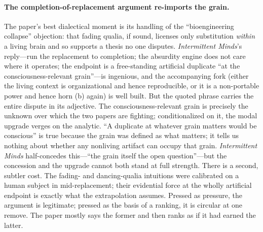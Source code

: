 \documentclass[11pt]{article}
\newcommand{\IM}{\emph{Intermittent Minds}}
\begin{document}
\paragraph{The completion-of-replacement argument re-imports the grain.} The paper's best dialectical moment is its handling of the ``bioengineering collapse'' objection: that fading qualia, if sound, licenses only substitution \emph{within} a living brain and so supports a thesis no one disputes. \IM{}'s reply---run the replacement to completion; the absurdity engine does not care where it operates; the endpoint is a free-standing artificial duplicate ``at the consciousness-relevant grain''---is ingenious, and the accompanying fork (either the living context is organizational and hence reproducible, or it is a non-portable power and hence horn (b) again) is well built. But the quoted phrase carries the entire dispute in its adjective. The consciousness-relevant grain is precisely the unknown over which the two papers are fighting; conditionalized on it, the modal upgrade verges on the analytic. ``A duplicate at whatever grain matters would be conscious'' is true because the grain was defined as what matters; it tells us nothing about whether any nonliving artifact can occupy that grain. \IM{} half-concedes this---``the grain itself the open question''---but the concession and the upgrade cannot both stand at full strength. There is a second, subtler cost. The fading- and dancing-qualia intuitions were calibrated on a human subject in mid-replacement; their evidential force at the wholly artificial endpoint is exactly what the extrapolation assumes. Pressed as pressure, the argument is legitimate; pressed as the basis of a ranking, it is circular at one remove. The paper mostly says the former and then ranks as if it had earned the latter.
\end{document}
